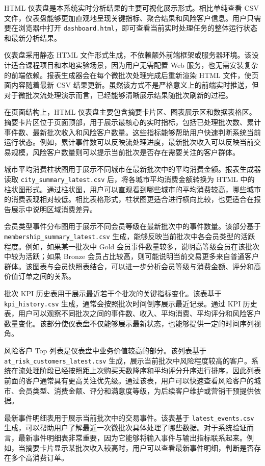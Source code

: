 \documentclass[12pt,hyperref,a4paper,UTF8]{ctexart}
\begin{document}
HTML 仪表盘是本系统实时分析结果的主要可视化展示形式。相比单纯查看 CSV 文件，仪表盘能够更加直观地呈现关键指标、聚合结果和风险客户信息。用户只需要在浏览器中打开 \texttt{dashboard.html}，即可查看当前实时处理任务的整体运行状态和最新分析结果。

仪表盘采用静态 HTML 文件形式生成，不依赖额外前端框架或服务器环境。该设计适合课程项目和本地实验场景，因为用户无需配置 Web 服务，也无需安装复杂的前端依赖。报表生成器会在每个微批次处理完成后重新渲染 HTML 文件，使页面内容随着最新 CSV 结果更新。虽然该方式不是严格意义上的前端实时推送，但对于微批次流处理演示而言，已经能够清晰展示结果随批次刷新的过程。

在页面结构上，HTML 仪表盘主要包含摘要卡片区、图表展示区和数据表格区。摘要卡片区位于页面顶部，用于展示最核心的实时指标，包括已处理批次数、累计事件数、最新批次收入和风险客户数量。这些指标能够帮助用户快速判断系统当前运行状态。例如，累计事件数可以反映流处理进度，最新批次收入可以反映当前交易规模，风险客户数量则可以提示当前批次是否存在需要关注的客户群体。

城市平均消费柱状图用于展示不同城市在最新批次中的平均消费金额。报表生成器读取 \texttt{city\_summary\_latest.csv} 后，将各城市平均消费金额转换为 HTML 中的柱状图形式。通过柱状图，用户可以直观看到哪些城市的平均消费较高，哪些城市的消费表现相对较低。相比表格形式，柱状图更适合进行横向比较，也更适合在报告展示中说明区域消费差异。

会员类型事件分布图用于展示不同会员等级在最新批次中的事件数量。该部分基于 \texttt{membership\_summary\_latest.csv} 生成，能够反映当前批次中各会员类型的活跃程度。例如，如果某一批次中 Gold 会员事件数量较多，说明高等级会员在该批次中较为活跃；如果 Bronze 会员占比较高，则可能说明当前交易更多来自普通客户群体。该图表与会员快照表结合，可以进一步分析会员等级与消费金额、评分和高价值订单之间的关系。

批次 KPI 历史表用于展示最近若干个批次的关键指标变化。该表基于 \texttt{kpi\_history.csv} 生成，通常会按照批次时间倒序展示最近记录。通过 KPI 历史表，用户可以观察不同批次之间的事件数、收入、平均消费、平均评分和风险客户数量变化。该部分使仪表盘不仅能够展示最新状态，也能够提供一定的时间序列视角。

风险客户 Top 列表是仪表盘中业务价值较高的部分。该列表基于 \texttt{at\_risk\_customers\_latest.csv} 生成，展示当前批次中风险程度较高的客户。系统在流处理阶段已经按照距上次购买天数降序和平均评分升序进行排序，因此列表前面的客户通常具有更高关注优先级。通过该表，用户可以快速查看风险客户的城市、会员类型、消费金额、评分和满意度等级，为后续客户维护或营销干预提供依据。

最新事件明细表用于展示当前批次中的交易事件。该表基于 \texttt{latest\_events.csv} 生成，可以帮助用户了解最近一次微批次具体处理了哪些数据。对于系统验证而言，最新事件明细表非常重要，因为它能够将输入事件与输出指标联系起来。例如，当摘要卡片显示某批次收入较高时，用户可以查看最新事件明细，判断是否存在多个高消费订单。
\end{document}
